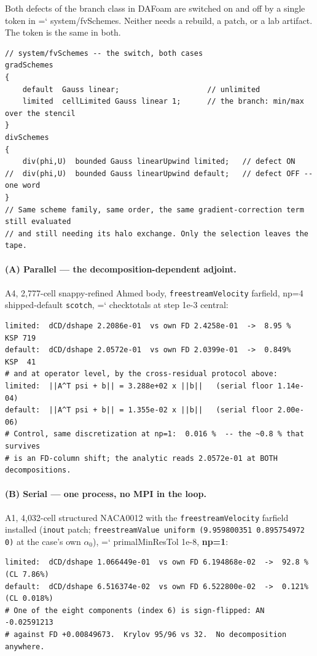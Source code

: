 \documentclass[11pt,a4paper]{article}
\newcommand{\artifact}[1]{{\small\ttfamily\hyphenchar\font=`\-\relax
  \def\_{\textunderscore\allowbreak}#1}}
\begin{document}
Both defects of the branch class in DAFoam are switched on and off by a single token in
\artifact{system/fvSchemes}. Neither needs a rebuild, a patch, or a lab artifact. The token is
the same in both.

\begin{lstlisting}
// system/fvSchemes -- the switch, both cases
gradSchemes
{
    default  Gauss linear;                    // unlimited
    limited  cellLimited Gauss linear 1;      // the branch: min/max over the stencil
}
divSchemes
{
    div(phi,U)  bounded Gauss linearUpwind limited;   // defect ON
//  div(phi,U)  bounded Gauss linearUpwind default;   // defect OFF -- one word
}
// Same scheme family, same order, the same gradient-correction term still evaluated
// and still needing its halo exchange. Only the selection leaves the tape.
\end{lstlisting}

\paragraph{(A) Parallel --- the decomposition-dependent adjoint.} A4, 2{,}777-cell
snappy-refined Ahmed body, \texttt{freestreamVelocity} farfield, np=4 shipped-default
\texttt{scotch}, \artifact{check\_totals} at step 1e-3 central:

\begin{lstlisting}
limited:  dCD/dshape 2.2086e-01  vs own FD 2.4258e-01  ->  8.95 %   KSP 719
default:  dCD/dshape 2.0572e-01  vs own FD 2.0399e-01  ->  0.849%   KSP  41
# and at operator level, by the cross-residual protocol above:
limited:  ||A^T psi + b|| = 3.288e+02 x ||b||   (serial floor 1.14e-04)
default:  ||A^T psi + b|| = 1.355e-02 x ||b||   (serial floor 2.00e-06)
# Control, same discretization at np=1:  0.016 %  -- the ~0.8 % that survives
# is an FD-column shift; the analytic reads 2.0572e-01 at BOTH decompositions.
\end{lstlisting}

\paragraph{(B) Serial --- one process, no MPI in the loop.} A1, 4{,}032-cell structured
NACA0012 with the \texttt{freestreamVelocity} farfield installed (\texttt{inout} patch;
\texttt{freestreamValue uniform (9.959800351 0.895754972 0)} at the case's own
\(\alpha_0\)), \artifact{primalMinResTol} 1e-8, \textbf{np=1}:

\begin{lstlisting}
limited:  dCD/dshape 1.066449e-01  vs own FD 6.194868e-02  ->  92.8 %  (CL 7.86%)
default:  dCD/dshape 6.516374e-02  vs own FD 6.522800e-02  ->  0.121%  (CL 0.018%)
# One of the eight components (index 6) is sign-flipped: AN -0.02591213
# against FD +0.00849673.  Krylov 95/96 vs 32.  No decomposition anywhere.
\end{lstlisting}
\end{document}
